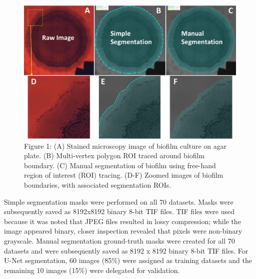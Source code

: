 \documentclass[conference]{IEEEtran}
\begin{document}
\begin{figure}[h]
\centering
\includegraphics[scale=0.25]{Slide1.PNG}
\caption{Figure 1: (A) Stained microscopy image of biofilm culture on agar plate. (B) Multi-vertex polygon ROI traced around biofilm boundary. (C) Manual segmentation of biofilm using free-hand region of interest (ROI) tracing. (D-F) Zoomed images of biofilm boundaries, with associated segmentation ROIs.}
\label{figName1}
\end{figure}


Simple segmentation masks were performed on all 70 datasets. Masks were subsequently saved as 8192x8192 binary 8-bit TIF files. TIF files were used because it was noted that JPEG files resulted in lossy compression; while the image appeared binary, closer inspection revealed that pixels were non-binary grayscale.  Manual segmentation ground-truth masks were created for all 70 datasets and were subsequently saved as 8192 x 8192 binary 8-bit TIF files. For U-Net segmentation, 60 images (85\%) were assigned as training datasets and the remaining 10 images (15\%) were delegated for validation. 

\end{document}
